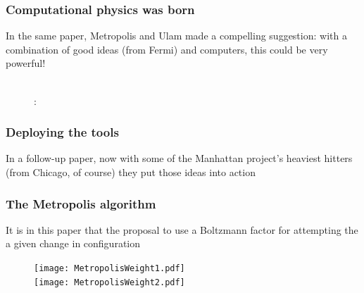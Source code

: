 \documentclass[hyperref={colorlinks=true}]{beamer}
\begin{document}

\begin{frame}%
  \frametitle{Computational physics was born}
  
  In the same paper, Metropolis and Ulam made a compelling suggestion: with a combination of good ideas (from Fermi) and computers, this could be very powerful!
  
  \begin{figure}
    \centering
    \\
    :\\
  \end{figure}
  
\end{frame}


\begin{frame}%
  \frametitle{Deploying the tools}
  
  In a follow-up paper, now with some of the Manhattan project's heaviest hitters (from Chicago, of course) they put those ideas into action
  
  \begin{figure}
    \centering
  \end{figure}
  
\end{frame}


\begin{frame}%
  \frametitle{The Metropolis algorithm}
  
  It is in this paper that the proposal to use a Boltzmann factor for attempting the  a given change in configuration
  
  \begin{center}
  \begin{minipage}{0.8\columnwidth}
  \begin{framed}
  \begin{figure}
    \centering
    \texttt{[image: MetropolisWeight1.pdf]}\\
    \texttt{[image: MetropolisWeight2.pdf]}
  \end{figure}
  \end{framed}
  \end{minipage}
  \end{center}
  
  \vspace{-0.2cm}
  
  \begin{figure}
    \centering
  \end{figure}
  
\end{frame}
\end{document}
